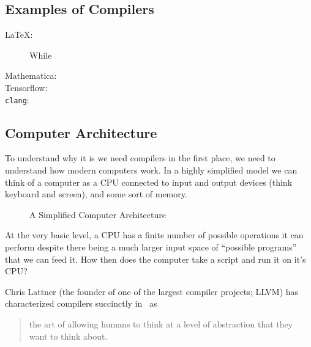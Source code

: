 \subsection{Examples of Compilers}
\begin{description}
    \item[\LaTeX{}:] While
    \item[Mathematica:]
    \item[Tensorflow:]
    \item[\texttt{clang}:]
\end{description}

\subsection{Computer Architecture}
To understand why it is we need compilers in the first place, we need to understand how modern computers work.
In a highly simplified model we can think of a computer as a \ac{CPU} connected to input and output devices (think keyboard and screen), and some sort of memory.
\begin{figure}[h]
    \centering
    \caption{A Simplified Computer Architecture}
    \label{fig:comparch}
\end{figure}

At the very basic level, a \ac{CPU} has a finite number of possible operations it can perform despite there being a much larger input space of ``possible programs'' that we can feed it.
How then does the computer take a script and run it on it's CPU?


Chris Lattner (the founder of one of the largest compiler projects; LLVM) has characterized compilers succinctly in~\cite{lattnerquote} as
\begin{quote}
    the art of allowing humans to think at a level of abstraction that they want to think about.
\end{quote}

